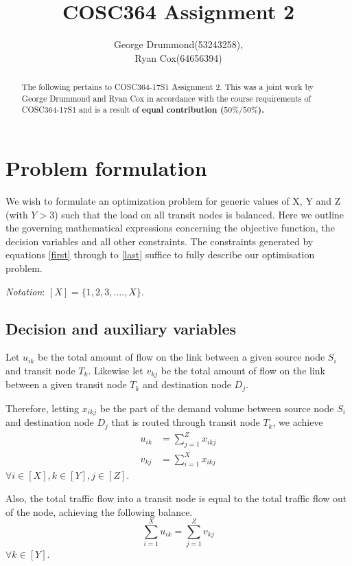 \documentclass[12pt,twoside]{article}
\begin{document}
\title{COSC364 Assignment 2}
\author{George Drummond(53243258), \\Ryan Cox(64656394)}
\maketitle
\thispagestyle{empty}

\begin{abstract}
The following pertains to COSC364-17S1  Assignment 2.
This was a joint work by George Drummond and Ryan Cox in accordance with the course requirements of COSC364-17S1 and is a result of \bf{equal} contribution ($50\% / 50\%$).
\end{abstract}

\tableofcontents

\newpage
\section{Problem formulation}
We wish to formulate an optimization problem for generic values of X, Y and Z (with $ Y> 3$) such that the load on all transit nodes is balanced. Here we outline the governing mathematical expressions concerning the objective function, the decision variables and all other constraints. The constraints generated by equations \ref{first} through to \ref{last} suffice to fully describe our optimisation problem.

\emph{Notation}: $[X] = \{1,2,3,....,X\}$.

\subsection{Decision and auxiliary variables}
Let $u_{ik}$ be the total amount of flow on the link between a given source node $S_i$ and transit node $T_k$.
Likewise let $v_{kj}$ be the total amount of flow on the link between a given transit node $T_k$ and destination node $D_j$.

Therefore, letting $x_{ikj}$ be the part of the demand volume between source node $S_i$ and destination node $D_j$ that is routed through transit node $T_k$, we achieve 
\begin{align}\label{first}
	u_{ik} &= \sum_{j=1}^{Z}x_{ikj}\\
	v_{kj} &= \sum_{i=1}^{X}x_{ikj}
\end{align}
$\forall i \in [X], k \in [Y], j \in [Z]$.

Also, the total traffic flow into a transit node is equal to the total traffic flow out of the node, achieving the following balance.
\begin{equation}
	\sum_{i=1}^{X}u_{ik} = \sum_{j=1}^{Z}v_{kj}
\end{equation}
$\forall k \in [Y]$.
\end{document}
